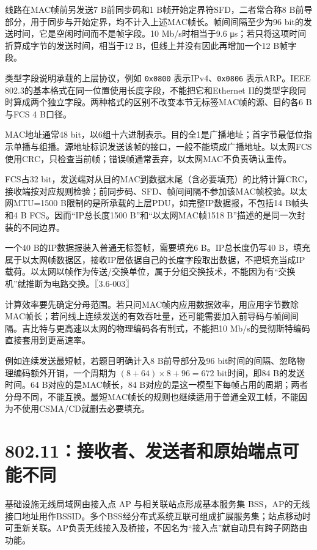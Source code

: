 线路在MAC帧前另发送7 B前同步码和1 B帧开始定界符SFD，二者常合称8 B前导部分，用于同步与开始定界，均不计入上述MAC帧长。帧间间隔至少为96 bit的发送时间，它是空闲时间而不是帧字段。10 Mb/s时相当于9.6 μs；若只将这项时间折算成字节的发送时间，相当于12 B，但线上并没有因此再增加一个12 B帧字段。

类型字段说明承载的上层协议，例如 \texttt{0x0800} 表示IPv4、\texttt{0x0806} 表示ARP。IEEE 802.3的基本格式在同一位置使用长度字段，不能把它和Ethernet II的类型字段同时算成两个独立字段。两种格式的区别不改变本节无标签MAC帧的源、目的各6 B与FCS 4 B口径。

MAC地址通常48 bit，以6组十六进制表示。目的全1是广播地址；首字节最低位指示单播与组播。源地址标识发送该帧的接口，一般不能填成广播地址。以太网FCS使用CRC，只检查当前帧；错误帧通常丢弃，以太网MAC不负责确认重传。

FCS占32 bit，发送端对从目的MAC到数据末尾（含必要填充）的比特计算CRC，接收端按对应规则检验；前同步码、SFD、帧间间隔不参加该MAC帧校验。以太网MTU=1500 B限制的是所承载的上层PDU，如完整IP数据报，不包括14 B帧头和4 B FCS。因而``IP总长度1500 B''和``以太网MAC帧1518 B''描述的是同一次封装的不同边界。

一个40 B的IP数据报装入普通无标签帧，需要填充6 B。IP总长度仍写40 B，填充属于以太网帧数据区，接收IP层依据自己的长度字段取出数据，不把填充当成IP载荷。以太网以帧作为传送/交换单位，属于分组交换技术，不能因为有``交换机''就推断为电路交换。〖3.6-003〗

计算效率要先确定分母范围。若只问MAC帧内应用数据效率，用应用字节数除MAC帧长；若问线上连续发送的有效吞吐量，还可能需要加入前导码与帧间间隔。吉比特与更高速以太网的物理编码各有制式，不能把10 Mb/s的曼彻斯特编码直接套用到更高速率。

例如连续发送最短帧，若题目明确计入8 B前导部分及96 bit时间的间隔、忽略物理编码额外开销，一个周期为 \((8+64)\times8+96=672\) bit时间，即84 B的发送时间。64 B对应的是MAC帧长，84 B对应的是这一模型下每帧占用的周期；两者分母不同，不能互换。最短MAC帧长的规则也继续适用于普通全双工帧，不能因为不使用CSMA/CD就删去必要填充。

\section{802.11：接收者、发送者和原始端点可能不同}\label{CN03-16}

基础设施无线局域网由接入点 AP 与相关联站点形成基本服务集 BSS，AP的无线接口地址用作BSSID。多个BSS经分布式系统互联可组成扩展服务集；站点移动时可重新关联。AP负责无线接入及桥接，不因名为``接入点''就自动具有跨子网路由功能。

